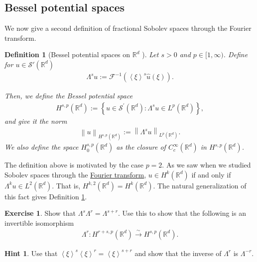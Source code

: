 \documentclass[
    a4paper,
    DIV=14,
    abstract=true,
    numbers=noenddot
]
{scrartcl}
\newtheorem{definition}[theorem]{Definition}
\theoremstyle{definition}
\newtheorem{exercise}{Exercise}
\newtheorem*{hint}{Hint}
\newcommand{\wh}[1]{\widehat{#1}}
\newcommand{\br}[1]{\left\langle#1\right\rangle}
\renewcommand{\norm}[1]{\left\lVert #1 \right\rVert}\renewcommand{\abs}[1]{\left| #1 \right|}
\newcommand{\iso}{\xrightarrow{\sim}}
\newcommand{\R}{\mathbb{R}}
\newcommand{\Ff}{\mathcal{F}}
\newcommand{\Ss}{\mathcal{S}}
\begin{document}
\subsection{Bessel potential spaces}
We now give a second definition of fractional Sobolev spaces through the Fourier transform.
\begin{definition}[Bessel potential spaces on $\R^d$ ]\label{bessel potential def}
  Let $s>0$ and $p \in [1,\infty)$. Define for $u \in \Ss'(\R^d)$
  \begin{align*}
    \Lambda^s u := \Ff^{-1}\left(\br{\xi}^s \wh{u}(\xi)\right).
  \end{align*}

  Then, we define the \emph{Bessel potential space}
  \begin{align*}
    H^{s,p}(\R^d):=\left\{u \in \mathcal{S}^{\prime}(\mathbb{R}^d): \Lambda ^s u \in L^p(\mathbb{R}^d)\right\},
  \end{align*}
  and give it the norm
  \begin{align*}
    \norm{u}_{H^{s,p}(\R^d)}:= \norm{\Lambda^s u}_{L^p(\R^d)}.
  \end{align*}
  We also define the space $H_0^{s,p}(\R^d)$ as the closure of $C_c^\infty(\R^d)$ in $H^{s,p}(\R^d)$.
\end{definition}
The definition above is motivated by the case $p=2$. As we saw when we studied Sobolev spaces through the \href{https://nowheredifferentiable.com/2023-01-29-PDE-1-Fourier/#:~:text=Sobolev%20spaces-,Sobolev%20spaces,-form%20a%20particular}{Fourier transform}, $u \in H^k(\R^d)$ if and only if $\Lambda^k u \in L^2(\R^d)$. That is, $H^{k,2}(\R^d)=H^{k}(\R^d)$.
The natural generalization of this fact gives Definition \ref{bessel potential def}.
\begin{exercise}
  Show that $\Lambda^s\Lambda^r=\Lambda^{s+r}$. Use this to show that the following is an invertible isomorphism
  \begin{align*}
    \Lambda^r: H^{r+s,p}(\R^d) \iso  H^{s,p}(\R^d).
  \end{align*}
\end{exercise}
\begin{hint}
  Use that $\br{\xi}^s\br{\xi}^r=\br{\xi}^{s+r}$ and show that the inverse of $\Lambda^r$ is $\Lambda^{-r}$.
\end{hint}
\end{document}
